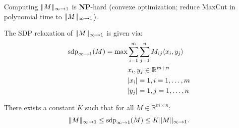 	Computing $ \Vert {M} \Vert_{\infty\to 1}$ is \textbf{NP}-hard (convexe optimization; reduce MaxCut in polynomial time to $ \Vert {M} \Vert_{\infty\to 1}$).
	
	\begin{dfn} The SDP relaxation of $ \Vert {M} \Vert_{\infty\to1}$ is given via:
		\begin{align*}
			\operatorname{sdp}_{\infty\to 1} (M) = \max 
			&\sum_{i=1}^m\sum_{j=1}^n M_{ij} \langle{x_i},{y_j}\rangle\\
			&x_i,y_j\in\mathbb{R}^{m+n}\\
			&{\left|{x_i}\right|}=1, i=1,\dots,m\\
			&{\left|{y_j}\right|}=1, j=1,\dots,n
		\end{align*}
	\end{dfn}
	\begin{theo} \label{theo:G_ineq}
		There exists a constant $K$ such that for all $M\in\mathbb{R}^{m\times n}$:
		\begin{equation}
			 \Vert {M} \Vert_{\infty\to 1} \leq \operatorname{sdp}_{\infty\to 1} (M) \leq K  \Vert {M} \Vert_{\infty\to 1}.
		\end{equation}
	\end{theo}
